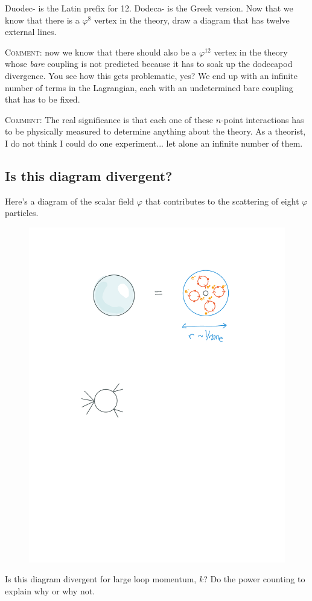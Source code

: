 \documentclass[12pt]{article}
\numberwithin{equation}{section}    %
\begin{document}
Duodec- is the Latin prefix for 12. Dodeca- is the Greek version. Now that we know that there is a $\varphi^8$ vertex in the theory, draw a diagram that has twelve external lines. 

\textsc{Comment:} now we know that there should also be a $\varphi^{12}$ vertex in the theory whose \emph{bare} coupling is not predicted because it has to soak up the dodecapod divergence. You see how this gets problematic, yes? We end up with an infinite number of terms in the Lagrangian, each with an undetermined bare coupling that has to be fixed. 

\textsc{Comment:} The real significance is that each one of these $n$-point interactions has to be physically measured to determine anything about the theory. As a theorist, I do not think I could do one experiment... let alone an infinite number of them. 

\subsection{Is this diagram divergent?}

Here's a diagram of the scalar field $\varphi$ that contributes to the scattering of eight $\varphi$ particles. 
\begin{figure}[h]
	\centering
	\includegraphics[width=.3\textwidth]{figures/hw9_8pt.pdf}
\end{figure}
Is this diagram divergent for large loop momentum, $k$? Do the power counting to explain why or why not.
\end{document}
